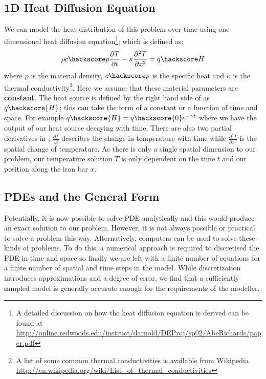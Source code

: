 \subsection{1D Heat Diffusion Equation}
We can model the heat distribution of this problem over time using one dimensional heat diffusion equation\footnote{A detailed discussion on how the heat diffusion equation is derived can be found at \url{http://online.redwoods.edu/instruct/darnold/DEProj/sp02/AbeRichards/paper.pdf}};
which is defined as:
\begin{equation}
\rho c\hackscore p \frac{\partial T}{\partial t} - \kappa \frac{\partial^{2} T}{\partial x^{2}} = q\hackscore H 
\label{eqn:hd}
\end{equation}
where $\rho$ is the material density, $c\hackscore p$ is the specific heat and $\kappa$ is the thermal 
conductivity\footnote{A list of some common thermal conductivities is available from Wikipedia \url{http://en.wikipedia.org/wiki/List_of_thermal_conductivities}}. Here we assume that these material 
parameters are \textbf{constant}. 
The heat source is defined by the right hand side of  as $q\hackscore{H}$; this can take the form of a constant or a function of time and space. For example $q\hackscore{H} = q\hackscore{0}e^{-\gamma t}$ where we have the output of our heat source decaying with time. There are also two partial derivatives in ; $\frac{\partial T}{\partial t}$ describes the change in temperature with time while $\frac{\partial ^2 T}{\partial x^2}$ is the spatial change of temperature. As there is only a single spatial dimension to our problem, our temperature solution $T$ is only dependent on the time $t$ and our position along the iron bar $x$.

\subsection{PDEs and the General Form}
Potentially, it is now possible to solve PDE  analytically and this would produce an exact solution to our problem. However, it is not always possible or practical to solve a problem this way. Alternatively, computers can be used to solve these kinds of problems. To do this, a numerical approach is required to discretised 
the PDE  in time and space so finally we are left with a finite number of equations for a finite number of spatial and time steps in the model. While discretization introduces approximations and a degree of error, we find that a sufficiently sampled model is generally accurate enough for the requirements of the modeller.

